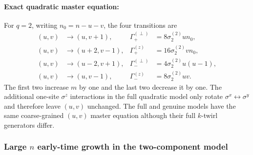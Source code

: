 \documentclass{article}
\theoremstyle{definition}
\begin{document}
\paragraph{Exact quadratic master equation:} For $q=2$, writing $n_0=n-u-v$, the four transitions are
\begin{align}
    (u,v)&\longrightarrow(u,v+1),
    &\Gamma_+^{(\perp)}&=8\sigma_2^{(2)}un_0,
    \\
    (u,v)&\longrightarrow(u+2,v-1),
    &\Gamma_+^{(z)}&=16\sigma_2^{(2)}vn_0,
    \\
    (u,v)&\longrightarrow(u-2,v+1),
    &\Gamma_-^{(\perp)}&=4\sigma_2^{(2)}u(u-1),
    \\
    (u,v)&\longrightarrow(u,v-1),
    &\Gamma_-^{(z)}&=8\sigma_2^{(2)}uv.
\end{align}
The first two increase $m$ by one and the last two decrease it by one.  The
additional one-site $\sigma^z$ interactions in the full quadratic model
only rotate $\sigma^x\leftrightarrow\sigma^y$ and therefore leave $(u,v)$
unchanged.  The full and genuine models have the same coarse-grained
$(u,v)$ master equation although their full $k$-twirl generators differ.

\subsubsection{Large $n$ early-time growth in the two-component model}
\end{document}

